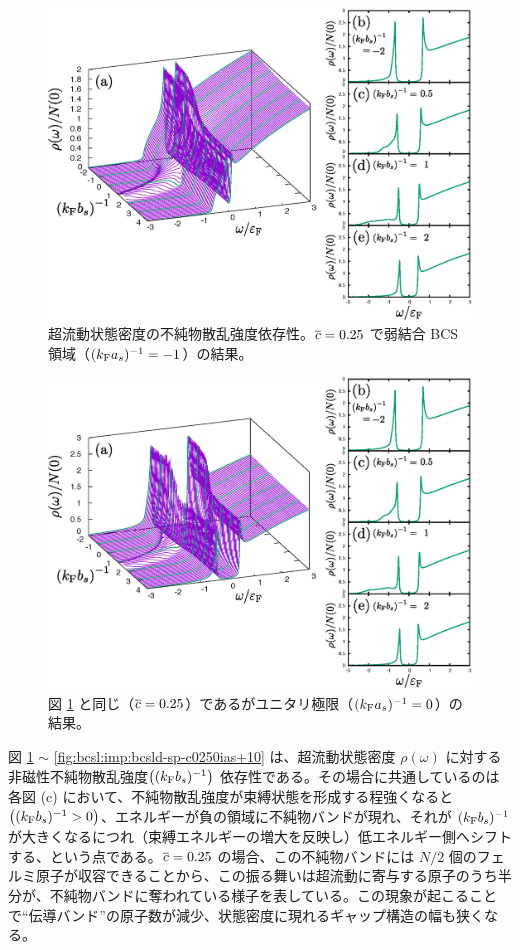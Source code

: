 \begin{figure}[t]
\centering
\includegraphics[width=130mm]{eps/bcsl-dos-sp-c0250-ias-10.eps}
\caption{超流動状態密度の不純物散乱強度依存性。$\overline{c}=0.25$ で弱結合 BCS 領域（$(k_{\text{F}} a_s)^{-1}=-1$）の結果。}
\label{fig:bcsl:imp:bcsld-sp-c0250ias-10}
\end{figure}
\begin{figure}[t]
\centering
\includegraphics[width=130mm]{eps/bcsl-dos-sp-c0250-ias000.eps}
\caption{図 \ref{fig:bcsl:imp:bcsld-sp-c0250ias-10} と同じ（$\overline{c}=0.25$）であるがユニタリ極限（$(k_{\text{F}} a_s)^{-1}=0$）の結果。}
\label{fig:bcsl:imp:bcsld-sp-c0250ias000}
\end{figure}



図 \ref{fig:bcsl:imp:bcsld-sp-c0250ias-10} $\sim$ \ref{fig:bcsl:imp:bcsld-sp-c0250ias+10} は、超流動状態密度 $\rho(\omega)$ に対する非磁性不純物散乱強度$\left((k_{\text{F}} b_s)^{-1}\right)$ 依存性である。その場合に共通しているのは各図 (c) において、不純物散乱強度が束縛状態を形成する程強くなると $\left((k_{\text{F}} b_s)^{-1}>0\right)$、エネルギーが負の領域に不純物バンドが現れ、それが $(k_{\text{F}} b_s)^{-1}$ が大きくなるにつれ（束縛エネルギーの増大を反映し）低エネルギー側へシフトする、という点である。$\overline{c}=0.25$ の場合、この不純物バンドには $N/2$ 個のフェルミ原子が収容できることから、この振る舞いは超流動に寄与する原子のうち半分が、不純物バンドに奪われている様子を表している。この現象が起こることで“伝導バンド”の原子数が減少、状態密度に現れるギャップ構造の幅も狭くなる。

